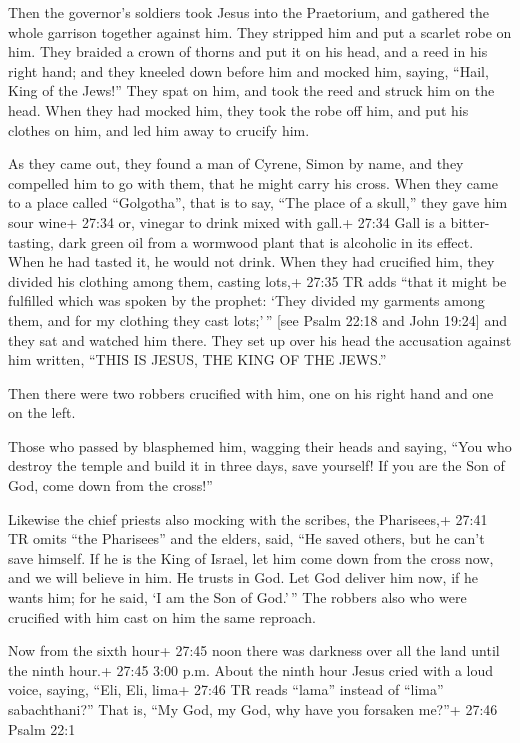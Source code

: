  Then the governor's soldiers took Jesus into the
Praetorium, and gathered the whole garrison together against him.
 They stripped him and put a scarlet robe on him.
 They braided a crown of thorns and put it on his head, and
a reed in his right hand; and they kneeled down before him and mocked
him, saying, ``Hail, King of the Jews!''  They spat on him,
and took the reed and struck him on the head.  When they
had mocked him, they took the robe off him, and put his clothes on him,
and led him away to crucify him.

 As they came out, they found a man of Cyrene, Simon by
name, and they compelled him to go with them, that he might carry his
cross.  When they came to a place called ``Golgotha'', that
is to say, ``The place of a skull,''  they gave him sour
wine+ 27:34 or, vinegar to drink mixed with gall.+ 27:34 Gall is a
bitter-tasting, dark green oil from a wormwood plant that is alcoholic
in its effect. When he had tasted it, he would not drink. 
When they had crucified him, they divided his clothing among them,
casting lots,+ 27:35 TR adds ``that it might be fulfilled which was
spoken by the prophet: `They divided my garments among them, and for my
clothing they cast lots;'\,'' {[}see Psalm 22:18 and John 19:24{]}
 and they sat and watched him there.  They set
up over his head the accusation against him written, ``THIS IS JESUS,
THE KING OF THE JEWS.''

 Then there were two robbers crucified with him, one on his
right hand and one on the left.

 Those who passed by blasphemed him, wagging their heads
 and saying, ``You who destroy the temple and build it in
three days, save yourself! If you are the Son of God, come down from the
cross!''

 Likewise the chief priests also mocking with the scribes,
the Pharisees,+ 27:41 TR omits ``the Pharisees'' and the elders, said,
 ``He saved others, but he can't save himself. If he is the
King of Israel, let him come down from the cross now, and we will
believe in him.  He trusts in God. Let God deliver him now,
if he wants him; for he said, `I am the Son of God.'\,'' 
The robbers also who were crucified with him cast on him the same
reproach.

 Now from the sixth hour+ 27:45 noon there was darkness
over all the land until the ninth hour.+ 27:45 3:00 p.m. 
About the ninth hour Jesus cried with a loud voice, saying, ``Eli, Eli,
lima+ 27:46 TR reads ``lama'' instead of ``lima'' sabachthani?'' That
is, ``My God, my God, why have you forsaken me?''+ 27:46 Psalm 22:1

